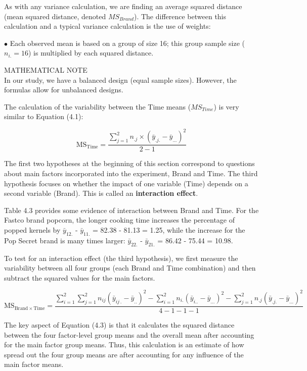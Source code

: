 \documentclass[
]{report}
\begin{document}
As with any variance calculation, we are finding an average squared distance (mean squared distance,
denoted \(MS_{Brand}\)). The difference between this calculation and a typical variance calculation is the use of weights:

\(\bullet\) Each observed mean is based on a group of size 16; this group sample size (\(n_{i.} = 16\)) is multiplied
by each squared distance.

MATHEMATICAL NOTE\\
In our study, we have a balanced design (equal sample sizes). However, the formulas allow for unbalanced designs.

The calculation of the variability between the Time means (\(MS_{Time}\)) is very similar to Equation (4.1):

\begin{equation}
\mathrm{MS}_{\mathrm{Time}}
= \frac{\sum_{j=1}^2 n_{.j} \times (\bar y_{.j.} - \bar y_{...})^2}{2 - 1}
\tag{4.2}
\end{equation}

The first two hypotheses at the beginning of this section correspond to questions about main factors
incorporated into the experiment, Brand and Time. The third hypothesis focuses on whether the impact of
one variable (Time) depends on a second variable (Brand). This is called an \textbf{interaction effect}.

Table 4.3 provides some evidence of interaction between Brand and Time. For the Fastco brand popcorn,
the longer cooking time increases the percentage of popped kernels by \(\bar y_{12.}\) - \(\bar y_{11.}\) = 82.38 - 81.13 = 1.25,
while the increase for the Pop Secret brand is many times larger: \(\bar y_{22.}\) - \(\bar y_{21.}\) = 86.42 - 75.44 = 10.98.

To test for an interaction effect (the third hypothesis), we first measure the variability between all four
groups (each Brand and Time combination) and then subtract the squared values for the main factors.

\begin{equation}
\mathrm{MS}_{\mathrm{Brand}\times\mathrm{Time}}
= \frac{\sum_{i=1}^2 \sum_{j=1}^2 n_{ij}(\bar y_{ij\,.} - \bar y_{..})^2
    - \sum_{i=1}^2 n_{i.}(\bar y_{i..} - \bar y_{...})^2
    - \sum_{j=1}^2 n_{.j}(\bar y_{.j.} - \bar y_{...})^2}
{4 - 1 - 1 - 1}
\tag{4.3}
\end{equation}

The key aspect of Equation (4.3) is that it calculates the squared distance between the four factor-level
group means and the overall mean after accounting for the main factor group means. Thus, this calculation is an
estimate of how spread out the four group means are after accounting for any influence of the main factor means.
\end{document}
